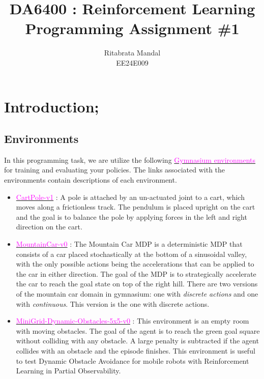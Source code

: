 \documentclass[11pt, a4]{article}
\begin{document}
	\author{Ritabrata Mandal\\ EE24E009}
	\title{DA6400 : Reinforcement Learning\\ Programming Assignment \#1}
	\maketitle
	
	\medskip
	
	\newpage
	\section{Introduction;}
		\subsection{Environments}
		In this programming task, we are utilize the following \href{https://gymnasium.farama.org/}{\textcolor{magenta}{Gymnasium environments}} for training
		and evaluating your policies. The links associated with the environments contain descriptions
		of each environment.
		\begin{itemize}
			\item \href{https://gymnasium.farama.org/environments/classic_control/cart_pole/}{\textcolor{magenta}{CartPole-v1}} : A pole is attached by an un-actuated joint to a cart, which moves along	a frictionless track. The pendulum is placed upright on the cart and the goal is to
			balance the pole by applying forces in the left and right direction on the cart.
			\item \href{https://gymnasium.farama.org/environments/classic_control/mountain_car/}{\textcolor{magenta}{MountainCar-v0}} : The Mountain Car MDP is a deterministic MDP that consists of a
			car placed stochastically at the bottom of a sinusoidal valley, with the only possible
			actions being the accelerations that can be applied to the car in either direction. The
			goal of the MDP is to strategically accelerate the car to reach the goal state on top of
			the right hill. There are two versions of the mountain car domain in gymnasium: one
			with \textit{discrete actions} and one with \textit{continuous}. This version is the one with discrete
			actions.
			\item \href{https://minigrid.farama.org/environments/minigrid/DynamicObstaclesEnv/}{\textcolor{magenta}{MiniGrid-Dynamic-Obstacles-5x5-v0}} : This environment is an empty
			room with moving obstacles. The goal of the agent is to reach the green goal square
			without colliding with any obstacle. A large penalty is subtracted if the agent collides
			with an obstacle and the episode finishes. This environment is useful to test Dynamic
			Obstacle Avoidance for mobile robots with Reinforcement Learning in Partial Observability.
		\end{itemize}
\end{document}
